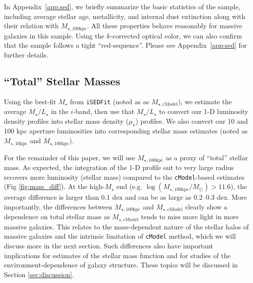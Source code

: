 \documentclass[a4paper,fleqn,usenatbib]{mnras}
\def\cmodel{\texttt{cModel}}
\def\mstar{{$M_{\star}$}}
\def\minn{{$M_{\star,10\mathrm{kpc}}$}}
\def\mtot{{$M_{\star,100\mathrm{kpc}}$}}
\def\mcmodel{{$M_{\star,\mathrm{cModel}}$}}
\def\logmtot{{$\log (M_{\star,100\mathrm{kpc}}/M_{\odot})$}}
\def\m2l{{$M_{\star}/L_{\star}$}}
\def\mden{{$\mu_{\star}$}}
\begin{document}
    In Appendix~\ref{app:sed}, we briefly summarize the basic statistics of 
    the sample, including average stellar age, metallicity, and internal dust 
    extinction along with their relation with \mtot{}. 
    All these properties behave reasonably for massive galaxies in this sample. 
    Using the $k$-corrected optical color, we can also confirm that the sample follows 
    a tight ``red-sequence''.  
    Please see Appendix~\ref{app:sed} for further details.
      

\subsection{``Total'' Stellar Masses}
    \label{ssec:mtotal}
    
    Using the best-fit \mstar{} from \texttt{iSEDFit} (noted as as \mcmodel{}), 
    we estimate the average \m2l{} in the $i$-band, then use that \m2l{} to convert 
    our 1-D luminosity density profiles into stellar mass density (\mden{}) profiles. 
    We also convert our 10 and 100 kpc aperture luminosities into corresponding stellar 
    mass estimates (noted as \minn{} and \mtot{}).

    For the remainder of this paper, we will use \mtot{} as a proxy of ``total'' 
    stellar mass. 
    As expected, the integration of the 1-D profile out to very large radius recovers 
    more luminosity (stellar mass) compared to the \cmodel{}-based estimates 
    (Fig \ref{fig:mass_diff}).
    At the high-\mstar{} end (e.g. \logmtot{}$>11.6$), the average difference is larger 
    than 0.1 dex and can be as large as 0.2--0.3 dex.  
    More importantly, the differences between \mtot{} and \mcmodel{} clearly show a 
    dependence on total stellar mass as \mcmodel{} tends to miss more light in 
    more massive galaxies.  
    This relates to the mass-dependent nature of the stellar halos of massive 
    galaxies and the intrinsic limitation of \cmodel{} method, which we will discuss
    more in the next section.
    Such differences also have important implications for estimates of the stellar 
    mass function and for studies of the environment-dependence of galaxy structure. These topics will be discussed in Section \ref{sec:discussion}.
    
\end{document}
